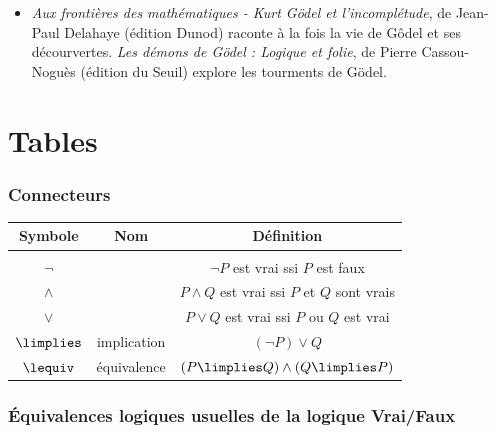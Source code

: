 \documentclass[11pt,class=report,crop=false]{standalone}
\begin{document}
\begin{itemize}
    \item \emph{Aux frontières des mathématiques - Kurt Gödel et l'incomplétude}, de Jean-Paul Delahaye (édition Dunod) raconte à la fois la vie de Gôdel et ses décourvertes. \emph{Les démons de Gödel : Logique et folie}, de Pierre Cassou-Noguès (édition du Seuil) explore les tourments de Gödel.
\end{itemize}

\section*{Tables}

\subsubsection{Connecteurs}


\begin{center}
\begin{tabular}{| c | c | c |}
    \hline 
	\textbf{Symbole}		& \textbf{Nom} 		& \textbf{Définition} \\
	\hline
	&&	\\[-2ex]
	$\lnot$ 	& \tnot			& $\lnot P$ est vrai ssi $P$ est faux \\
	$\land$ 	& \tand			& $P \land Q$ est vrai ssi $P$ et $Q$ sont vrais \\	
	$\lor$ 		& \tor			& $P \lor Q$ est vrai ssi $P$ ou $Q$ est vrai \\	
	$\limplies$ 	& implication	& $(\lnot P) \lor Q$ \\	
	$\lequiv$ 	& équivalence	& $(P \limplies Q) \land (Q \limplies P)$ \\
    \hline				
\end{tabular}
\end{center}


\subsubsection{Équivalences logiques usuelles de la logique Vrai/Faux}
\end{document}

